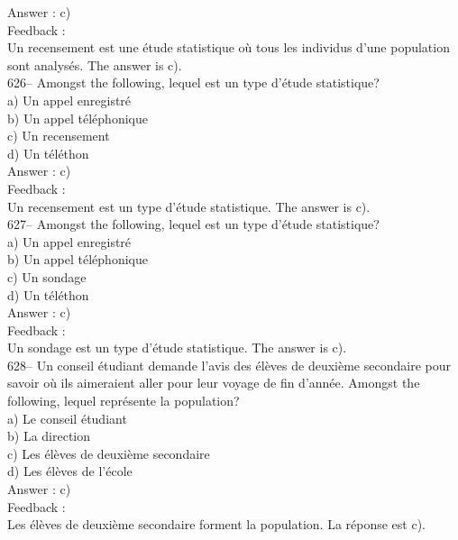 ﻿\documentclass[letterpaper, 12pt]{article}
\begin{document}
Answer : c)\\

Feedback : \\
Un recensement est une \'etude statistique o\`u tous les individus d'une
population sont analys\'es.  The answer is c).\\

626-- Amongst the following, lequel est un type d'\'etude
statistique?\\
a) Un appel enregistr\'e\\
b) Un appel t\'el\'ephonique\\
c) Un recensement\\
d) Un t\'el\'ethon\\

Answer : c)\\

Feedback : \\
Un recensement est un type d'\'etude statistique.  The answer is
c).\\

627-- Amongst the following, lequel est un type d'\'etude
statistique?\\
a) Un appel enregistr\'e\\
b) Un appel t\'el\'ephonique\\
c) Un sondage\\
d) Un t\'el\'ethon\\

Answer : c)\\

Feedback : \\
Un sondage est un type d'\'etude statistique.  The answer is c).\\

628-- Un conseil \'etudiant demande l'avis des \'el\`eves de deuxi\`eme
secondaire pour savoir o\`u ils aimeraient aller pour leur voyage de fin
d'ann\'ee.  Amongst the following, lequel repr\'esente la
population?\\
a) Le conseil \'etudiant\\
b) La direction\\
c) Les \'el\`eves de deuxi\`eme secondaire\\
d) Les \'el\`eves de l'\'ecole\\

Answer : c)\\

Feedback : \\
Les \'el\`eves de deuxi\`eme secondaire forment la population.  La r\'eponse
est c).\\
\end{document}

